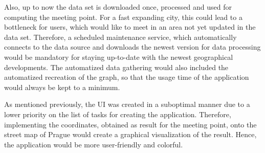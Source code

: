 \documentclass[thesis=M,english]{FITthesis}[2012/10/20]
\begin{document}

Also, up to now the data set is downloaded once, processed and used for computing the meeting point. For a fast expanding city, this could lead to a bottleneck for users, which would like to meet in an area not yet updated in the data set. Therefore, a scheduled maintenance service, which automatically connects to the data source and downloads the newest version for data processing would be mandatory for staying up-to-date with the newest geographical developments. The automatized data gathering would also included the automatized recreation of the graph, so that the usage time of the application would always be kept to a minimum.

As mentioned previously, the UI was created in a suboptimal manner due to a lower priority on the list of tasks for creating the application. Therefore, implementing the coordinates, obtained as result for the meeting point, onto the street map of Prague would create a graphical visualization of the result. Hence, the application would be more user-friendly and colorful.





\appendix
\end{document}
